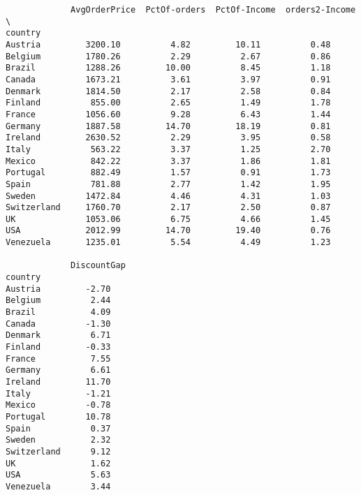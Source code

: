 \documentclass[11pt]{article}
\begin{document}
\begin{verbatim}
             AvgOrderPrice  PctOf-orders  PctOf-Income  orders2-Income  \
country                                                                  
Austria         3200.10          4.82         10.11          0.48        
Belgium         1780.26          2.29          2.67          0.86        
Brazil          1288.26         10.00          8.45          1.18        
Canada          1673.21          3.61          3.97          0.91        
Denmark         1814.50          2.17          2.58          0.84        
Finland          855.00          2.65          1.49          1.78        
France          1056.60          9.28          6.43          1.44        
Germany         1887.58         14.70         18.19          0.81        
Ireland         2630.52          2.29          3.95          0.58        
Italy            563.22          3.37          1.25          2.70        
Mexico           842.22          3.37          1.86          1.81        
Portugal         882.49          1.57          0.91          1.73        
Spain            781.88          2.77          1.42          1.95        
Sweden          1472.84          4.46          4.31          1.03        
Switzerland     1760.70          2.17          2.50          0.87        
UK              1053.06          6.75          4.66          1.45        
USA             2012.99         14.70         19.40          0.76        
Venezuela       1235.01          5.54          4.49          1.23        

             DiscountGap  
country                   
Austria         -2.70     
Belgium          2.44     
Brazil           4.09     
Canada          -1.30     
Denmark          6.71     
Finland         -0.33     
France           7.55     
Germany          6.61     
Ireland         11.70     
Italy           -1.21     
Mexico          -0.78     
Portugal        10.78     
Spain            0.37     
Sweden           2.32     
Switzerland      9.12     
UK               1.62     
USA              5.63     
Venezuela        3.44     
    \end{verbatim}
\end{document}
